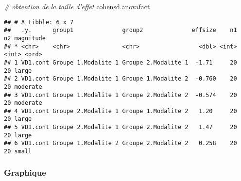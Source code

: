 \documentclass[
]{book}
\newenvironment{Shaded}{\begin{snugshade}}{\end{snugshade}}
\newcommand{\CommentTok}[1]{\textcolor[rgb]{0.56,0.35,0.01}{\textit{#1}}}
\newcommand{\NormalTok}[1]{#1}
\begin{document}
\begin{Shaded}
\begin{Highlighting}[]
\CommentTok{# obtention de la taille d'effet }
\NormalTok{cohensd.anovafact}
\end{Highlighting}
\end{Shaded}

\begin{verbatim}
## # A tibble: 6 x 7
##   .y.      group1              group2              effsize    n1    n2 magnitude
## * <chr>    <chr>               <chr>                 <dbl> <int> <int> <ord>    
## 1 VD1.cont Groupe 1.Modalite 1 Groupe 2.Modalite 1  -1.71     20    20 large    
## 2 VD1.cont Groupe 1.Modalite 1 Groupe 1.Modalite 2  -0.760    20    20 moderate 
## 3 VD1.cont Groupe 1.Modalite 1 Groupe 2.Modalite 2  -0.574    20    20 moderate 
## 4 VD1.cont Groupe 2.Modalite 1 Groupe 1.Modalite 2   1.20     20    20 large    
## 5 VD1.cont Groupe 2.Modalite 1 Groupe 2.Modalite 2   1.47     20    20 large    
## 6 VD1.cont Groupe 1.Modalite 2 Groupe 2.Modalite 2   0.258    20    20 small
\end{verbatim}

\hypertarget{graphique-3}{%
\subsubsection{Graphique}\label{graphique-3}}
\end{document}
